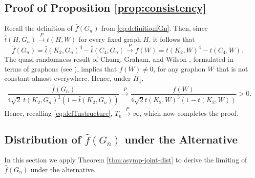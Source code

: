 \documentclass[11pt,reqno]{amsart}
\numberwithin{equation}{section}
\newcommand{\prob}{\stackrel{P}{\rightarrow}}
\theoremstyle{definition}
\begin{document}
\subsection{Proof of Proposition \ref{prop:consistency}} 
\label{sec:structureH1pf}

Recall the definition of $\hat f(G_n)$ from \eqref{eq:definitionfGn}. Then, since $\hat t(H, G_n) \overset{P} \rightarrow t(H, W)$ for every fixed graph $H$, it follows that $$\hat f(G_n) = \hat t(K_2,G_n)^4 - \hat t(C_4,G_n) \prob f(W) = t(K_2,W)^4 - t(C_4,W).$$ The quasi-randomness result of Chung, Graham, and Wilson \cite[Theorem 1]{chung1989cycle}, formulated in terms of graphons (see \cite[Section 11.8]{lovasz2012large}), implies that $f(W) \ne 0$, for any graphon $W$ that is not constant almost everywhere. Hence, under $H_1$,  
\begin{align*}
    \dfrac{ \hat f (G_n)}{4\sqrt{2}\ \hat{t}(K_{2},G_n)^{3}(1- \hat{t}(K_{2},G_n))}\prob \dfrac{f(W)}{4\sqrt{2}t(K_2,W)^3(1-t(K_2,W))}>0 . 
\end{align*}
Hence, recalling \eqref{eq:defTnstructure}, $T_n\prob\infty$, which now completes the proof.



\subsection{Distribution of $\hat f(G_n)$ under the Alternative}
\label{sec:structureGn}

In this section we apply Theorem \ref{thm:asymp-joint-dist} to derive the limiting of $\hat f(G_n)$ under the alternative. 
\end{document}
